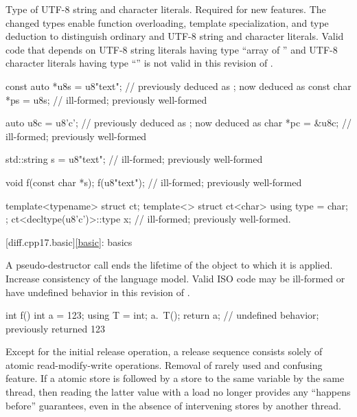 %
\change
Type of UTF-8 string and character literals.
\rationale
Required for new features.
The changed types enable function overloading, template specialization, and
type deduction to distinguish ordinary and UTF-8 string and character literals.
\effect
Valid \CppXVII{} code that depends on
UTF-8 string literals having type ``array of '' and
UTF-8 character literals having type ``''
is not valid in this revision of \Cpp{}.
\begin{codeblock}
const auto *u8s = u8"text";     //  previously deduced as ; now deduced as 
const char *ps = u8s;           // ill-formed; previously well-formed

auto u8c = u8'c';               //  previously deduced as ; now deduced as 
char *pc = &u8c;                // ill-formed; previously well-formed

std::string s = u8"text";       // ill-formed; previously well-formed

void f(const char *s);
f(u8"text");                    // ill-formed; previously well-formed

template<typename> struct ct;
template<> struct ct<char> {
  using type = char;
};
ct<decltype(u8'c')>::type x;    // ill-formed; previously well-formed.
\end{codeblock}

[diff.cpp17.basic]{\ref{basic}: basics}

\change
A pseudo-destructor call ends the lifetime of
the object to which it is applied.
\rationale
Increase consistency of the language model.
\effect
Valid ISO \CppXVII{} code may be ill-formed or
have undefined behavior in this revision of \Cpp{}.
\begin{example}
\begin{codeblock}
int f() {
  int a = 123;
  using T = int;
  a.~T();
  return a;         // undefined behavior; previously returned 123
}
\end{codeblock}
\end{example}

\change
Except for the initial release operation,
a release sequence consists solely of atomic read-modify-write operations.
\rationale
Removal of rarely used and confusing feature.
\effect
If a  atomic store is followed
by a  store to the same variable by the same thread,
then reading the latter value with a  load
no longer provides any ``happens before'' guarantees,
even in the absence of intervening stores by another thread.

